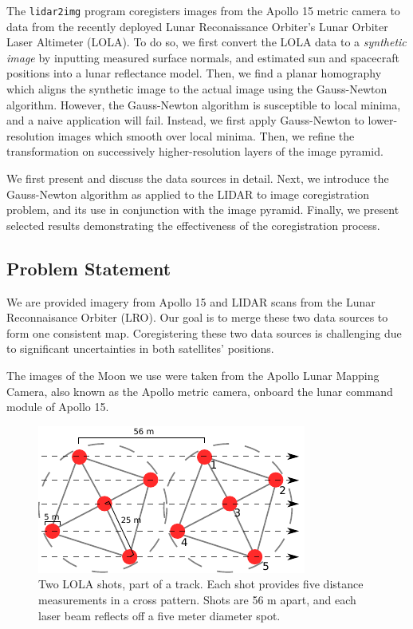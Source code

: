 \documentclass[float=false, crop=false]{standalone}
\begin{document}
The {\texttt{lidar2img}} program coregisters images
from the Apollo 15 metric camera to data from the recently deployed Lunar Reconaissance Orbiter's
Lunar Orbiter Laser Altimeter (LOLA). To do so, we first convert the LOLA data to a
{\emph{synthetic image}} by inputting measured surface normals, and estimated sun and spacecraft
positions into a lunar reflectance model. Then, we find a planar homography which aligns the synthetic
image to the actual image using the Gauss-Newton algorithm.  However, the Gauss-Newton algorithm is
susceptible to local minima, and a naive application will fail. Instead, we first
apply Gauss-Newton to lower-resolution images which smooth over local minima. Then, we
refine the transformation on successively higher-resolution layers of the image pyramid.

We first present and discuss the data sources in detail. Next, we introduce the
Gauss-Newton algorithm as applied to the LIDAR to image coregistration problem,
and its use in conjunction with the image pyramid. Finally, we present selected
results demonstrating the effectiveness of the coregistration process.

\subsection{Problem Statement}
We are provided imagery from Apollo 15 and LIDAR scans from the Lunar Reconnaisance
Orbiter (LRO). Our goal is to merge these two data sources to form one consistent map.
Coregistering these two data sources is challenging due to significant uncertainties
in both satellites' positions.

The images of the Moon we use were taken from the Apollo Lunar Mapping Camera, also
known as the Apollo metric camera, onboard the lunar command module of Apollo 15. 

\begin{figure}
	\centering
	\includegraphics[width=0.5 \columnwidth]{lola_shots.pdf}
	\caption{Two LOLA shots, part of a track. Each shot provides five
		distance measurements in a cross pattern. Shots are 56 m
		apart, and each laser beam reflects off a five meter diameter spot.}
	\label{fig:lolashots}
\end{figure}
\end{document}
